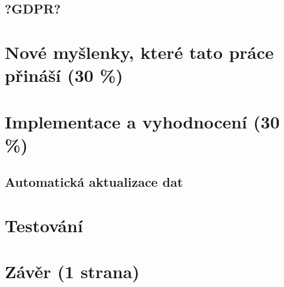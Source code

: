 \section{?GDPR?}



\chapter{Nové myšlenky, které tato práce přináší (30 \%)}
\label{chap:novinky}



\chapter{Implementace a vyhodnocení (30 \%)}
\label{chap:implementace}




\section{Automatická aktualizace dat}


\chapter{Testování}
\label{chap:testovani}


\chapter{Závěr (1 strana)}
\label{chap:zaver}
